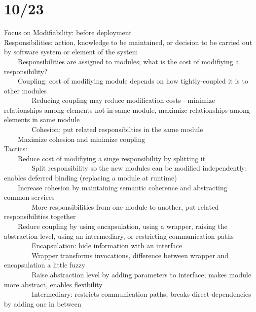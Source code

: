 \documentclass[10pt,letterpaper,unboxed,cm]{article}
\newcommand{\tab}{~~~~}
\begin{document}
\section{10/23}
Focus on Modifiability: before deployment\\
Responsibilities: action, knowledge to be maintained, or decision to be carried out by software system or element of the system\\
\tab Responsibilities are assigned to modules; what is the cost of modifiying a responsibility?\\
\tab Coupling: cost of modifiying module depends on how tightly-coupled it is to other modules\\
\tab \tab Reducing coupling may reduce modification costs - minimize relationships among elements not in same module, maximize relationships among elements in same module\\
\tab \tab Cohesion: put related responsibilties in the same module\\
\tab Maximize cohesion and minimize coupling\\
Tactics: \\
\tab Reduce cost of modifiying a singe responsibility by splitting it\\
\tab \tab Split responsibility so the new modules can be modified independently; enables deferred binding (replacing a module at runtime)\\
\tab Increase cohesion by maintaining semantic coherence and abstracting common services\\
\tab \tab More responsibilities from one module to another, put related responsibilities together\\
\tab Reduce coupling by using encapsulation, using a wrapper, raising the abstraction level, using an intermediary, or restricting communication paths\\
\tab \tab Encapsulation: hide information with an interface\\
\tab \tab Wrapper transforms invocations, difference between wrapper and encapsulation a little fuzzy\\
\tab \tab Raise abstraction level by adding parameters to interface; makes module more abstract, enables flexibility\\
\tab \tab Intermediary: restricts communication paths, breaks direct dependencies by adding one in between\\
\end{document}
